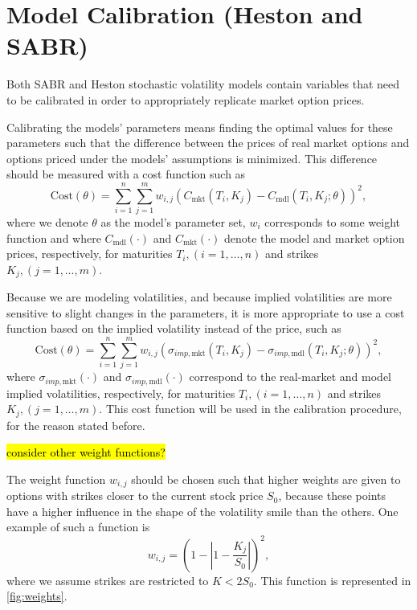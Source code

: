  
\section{Model Calibration (Heston and SABR)}
\label{section:Model Calibration}
Both SABR and Heston stochastic volatility models contain variables that need to be calibrated in order to appropriately replicate market option prices.


Calibrating the models' parameters means finding the optimal values for these parameters such that the difference between the prices of real market options and options priced under the models' assumptions is minimized. This difference should be measured with a cost function such as
\begin{equation}
\mathrm{Cost}(\theta)=\sum_{i=1}^n\sum_{j=1}^mw_{i,j}\left(C_{\mathrm{mkt}}(T_i,K_j)-C_{\mathrm{mdl}}(T_i,K_j;\theta)\right)^2,
\end{equation}
\noindent where we denote $\theta$ as the model's parameter set, $w_i$ corresponds to some weight function and where $C_{\mathrm{mdl}}(\cdot)$ and $C_{\mathrm{mkt}}(\cdot)$ denote the model and market option prices, respectively, for maturities $T_i,(i=1,\ldots,n)$ and strikes $K_j,(j=1,\ldots,m)$.

Because we are modeling volatilities, and because implied volatilities are more sensitive to slight changes in the parameters, it is more appropriate to use a cost function based on the implied volatility instead of the price, such as
\begin{equation}\label{cost}
\boxed{\mathrm{Cost}(\theta)=\sum_{i=1}^n\sum_{j=1}^mw_{i,j}\left(\sigma_{imp,\mathrm{mkt}}(T_i,K_j)-\sigma_{imp,\mathrm{mdl}}(T_i,K_j;\theta)\right)^2,}
\end{equation}
\noindent where $\sigma_{imp,\mathrm{mkt}}(\cdot)$ and $\sigma_{imp,\mathrm{mdl}}(\cdot)$ correspond to the real-market and model implied volatilities, respectively, for maturities $T_i,(i=1,\ldots,n)$ and strikes $K_j,(j=1,\ldots,m)$. This cost function will be used in the calibration procedure, for the reason stated before.

\hl{consider other weight functions?}


The weight function $w_{i,j}$ should be chosen such that higher weights are given to options with strikes closer to the current stock price $S_0$, because these points have a higher influence in the shape of the volatility smile than the others.
One example of such a function is
\begin{equation}\label{weight}
w_{i,j}=\left(1-\left|1-\frac{K_j}{S_0}\right|\right)^2,
\end{equation}
\noindent where we assume strikes are restricted to $K<2S_0$.
This function is represented in \autoref{fig:weights}.
    
